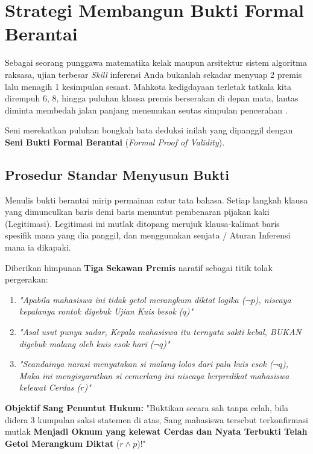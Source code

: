 \section{Strategi Membangun Bukti Formal Berantai}

Sebagai seorang punggawa matematika kelak maupun arsitektur sistem algoritma raksasa, ujian terbesar \textit{Skill} inferensi Anda bukanlah sekadar menyuap 2 premis lalu menagih 1 kesimpulan sesaat. Mahkota kedigdayaan terletak tatkala kita dirempuh 6, 8, hingga puluhan klausa premis berserakan di depan mata, lantas diminta membedah jalan panjang menemukan seutas simpulan pencerahan \cite{rosen2019}.

Seni merekatkan puluhan bongkah bata deduksi inilah yang dipanggil dengan \textbf{Seni Bukti Formal Berantai} (\textit{Formal Proof of Validity}).

\subsection{Prosedur Standar Menyusun Bukti}

Menulis bukti berantai mirip permainan catur tata bahasa. Setiap langkah klausa yang dimunculkan baris demi baris menuntut pembenaran pijakan kaki (Legitimasi). Legitimasi ini mutlak ditopang merujuk klausa-kalimat baris spesifik mana yang dia panggil, dan menggunakan senjata / Aturan Inferensi mana ia dikapaki.

\begin{contoh}
Diberikan himpunan \textbf{Tiga Sekawan Premis} naratif sebagai titik tolak pergerakan:
\begin{enumerate}
    \item \textit{"Apabila mahasiswa ini tidak getol merangkum diktat logika ($\neg p$), niscaya kepalanya rontok digebuk Ujian Kuis besok ($q$)"}
    \item \textit{"Asal usut punya sadar, Kepala mahasiswa itu ternyata sakti kebal, BUKAN digebuk malang oleh kuis esok hari ($\neg q$)"}
    \item \textit{"Seandainya narasi menyatakan si malang lolos dari palu kuis esok ($\neg q$), Maka ini mengisyaratkan si cemerlang ini niscaya berpredikat mahasiswa kelewat Cerdas ($r$)"}
\end{enumerate}
\textbf{Objektif Sang Penuntut Hukum:} "Buktikan secara sah tanpa celah, bila didera 3 kumpulan saksi statemen di atas, Sang mahasiswa tersebut terkonfirmasi mutlak \textbf{Menjadi Oknum yang kelewat Cerdas dan Nyata Terbukti Telah Getol Merangkum Diktat} ($r \land p$)!"
\end{contoh}

